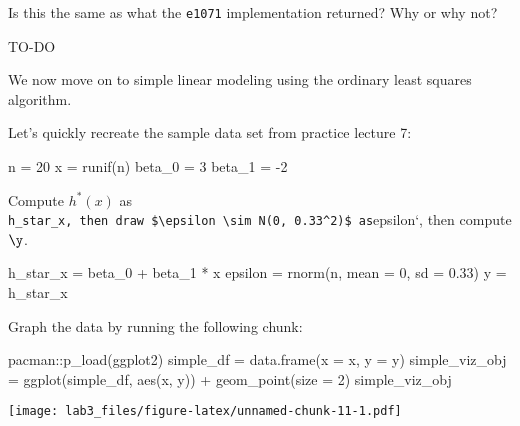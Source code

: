 \documentclass[
]{article}
\newenvironment{Shaded}{\begin{snugshade}}{\end{snugshade}}
\newcommand{\AttributeTok}[1]{\textcolor[rgb]{0.77,0.63,0.00}{#1}}
\newcommand{\DecValTok}[1]{\textcolor[rgb]{0.00,0.00,0.81}{#1}}
\newcommand{\FloatTok}[1]{\textcolor[rgb]{0.00,0.00,0.81}{#1}}
\newcommand{\FunctionTok}[1]{\textcolor[rgb]{0.00,0.00,0.00}{#1}}
\newcommand{\NormalTok}[1]{#1}
\newcommand{\OtherTok}[1]{\textcolor[rgb]{0.56,0.35,0.01}{#1}}
\newcommand{\SpecialCharTok}[1]{\textcolor[rgb]{0.00,0.00,0.00}{#1}}
\begin{document}
Is this the same as what the \texttt{e1071} implementation returned? Why
or why not?

TO-DO

We now move on to simple linear modeling using the ordinary least
squares algorithm.

Let's quickly recreate the sample data set from practice lecture 7:

\begin{Shaded}
\begin{Highlighting}[]
\NormalTok{n }\OtherTok{=} \DecValTok{20}
\NormalTok{x }\OtherTok{=} \FunctionTok{runif}\NormalTok{(n)}
\NormalTok{beta\_0 }\OtherTok{=} \DecValTok{3}
\NormalTok{beta\_1 }\OtherTok{=} \SpecialCharTok{{-}}\DecValTok{2}
\end{Highlighting}
\end{Shaded}

Compute \(h^*(x)\) as
\texttt{h\_star\_x,\ then\ draw\ \$\textbackslash{}epsilon\ \textbackslash{}sim\ N(0,\ 0.33\^{}2)\$\ as}epsilon`,
then compute \(\y\).

\begin{Shaded}
\begin{Highlighting}[]
\NormalTok{h\_star\_x }\OtherTok{=}\NormalTok{ beta\_0 }\SpecialCharTok{+}\NormalTok{ beta\_1 }\SpecialCharTok{*}\NormalTok{ x}
\NormalTok{epsilon }\OtherTok{=} \FunctionTok{rnorm}\NormalTok{(n, }\AttributeTok{mean =} \DecValTok{0}\NormalTok{, }\AttributeTok{sd =} \FloatTok{0.33}\NormalTok{)}
\NormalTok{y }\OtherTok{=}\NormalTok{ h\_star\_x}
\end{Highlighting}
\end{Shaded}

Graph the data by running the following chunk:

\begin{Shaded}
\begin{Highlighting}[]
\NormalTok{pacman}\SpecialCharTok{::}\FunctionTok{p\_load}\NormalTok{(ggplot2)}
\NormalTok{simple\_df }\OtherTok{=} \FunctionTok{data.frame}\NormalTok{(}\AttributeTok{x =}\NormalTok{ x, }\AttributeTok{y =}\NormalTok{ y)}
\NormalTok{simple\_viz\_obj }\OtherTok{=} \FunctionTok{ggplot}\NormalTok{(simple\_df, }\FunctionTok{aes}\NormalTok{(x, y)) }\SpecialCharTok{+} 
  \FunctionTok{geom\_point}\NormalTok{(}\AttributeTok{size =} \DecValTok{2}\NormalTok{)}
\NormalTok{simple\_viz\_obj}
\end{Highlighting}
\end{Shaded}

\texttt{[image: lab3\_files/figure-latex/unnamed-chunk-11-1.pdf]}
\end{document}
